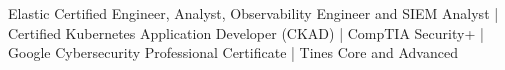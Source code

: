 Elastic Certified Engineer, Analyst, Observability Engineer and SIEM Analyst \hspace{1mm}|\hspace{1mm} Certified Kubernetes Application Developer (CKAD) \hspace{1mm}|\hspace{1mm} CompTIA Security+ \hspace{1mm}|\hspace{1mm} Google Cybersecurity Professional Certificate \hspace{1mm}|\hspace{1mm} Tines Core and Advanced
